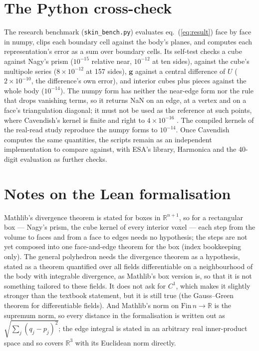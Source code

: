 \documentclass[10pt,a4paper]{article}
\begin{document}
\appendix
\section{The Python cross-check}\label{app:python}
The research benchmark (\texttt{skin\_bench.py}) evaluates eq.~(\ref{eq:result}) face by face in
numpy, clips each boundary cell against the body's planes, and computes each representation's error
as a sum over boundary cells. Its self-test checks a cube against Nagy's prism ($10^{-15}$ relative
near, $10^{-12}$ at ten sides), against the cube's multipole series ($8\times10^{-12}$ at 157 sides),
$\mathbf{g}$ against a central difference of $U$ ($2\times10^{-10}$, the difference's own error), and
interior cubes plus pieces against the whole body ($10^{-14}$). The numpy form has neither the
near-edge form nor the rule that drops vanishing terms, so it returns NaN on an edge, at a vertex and on
a face's triangulation diagonal; it must not be used as the reference at such points, where
Cavendish's kernel is finite and right to $4\times10^{-16}$ \citep[Table~B]{paperbench}. The compiled
kernels of the real-read study reproduce the numpy forms to $10^{-14}$. Once Cavendish computes the
same quantities, the scripts remain as an independent implementation to compare against, with ESA's
library, Harmonica and the 40-digit evaluation as further checks.

\section{Notes on the Lean formalisation}\label{app:lean}
Mathlib's divergence theorem is stated for boxes in $\mathbb{R}^{n+1}$, so for a
rectangular box --- Nagy's prism, the cube kernel of every interior voxel --- each step from the volume
to faces and from a face to edges needs no hypothesis; the steps are not yet composed into one
face-and-edge theorem for the box (index bookkeeping only). The general polyhedron needs the
divergence theorem as a hypothesis, stated as a theorem quantified over all fields differentiable on a
neighbourhood of the body with integrable divergence, as Mathlib's box version is, so that it is not
something tailored to these fields. It does not ask for $C^1$, which makes it slightly stronger than
the textbook statement, but it is still true (the Gauss--Green theorem for differentiable fields). And Mathlib's norm on $\mathrm{Fin}\,n\to\mathbb{R}$ is the supremum norm, so every distance
in the formalisation is written out as $\sqrt{\sum_j(q_j-p_j)^2}$; the edge integral is stated in an
arbitrary real inner-product space and so covers $\mathbb{R}^3$ with its Euclidean norm directly.
\end{document}
